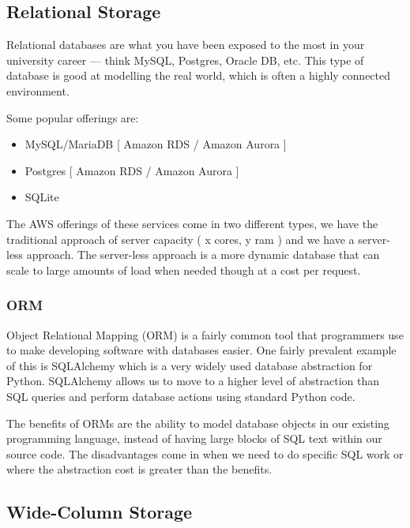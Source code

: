 \documentclass{csse4400}
\begin{document}
\subsection{Relational Storage}

Relational databases are what you have been exposed to the most in your university career ---
think MySQL, Postgres, Oracle DB, etc.
This type of database is good at modelling the real world, which is often a highly connected environment.

Some popular offerings are:
\begin{itemize}
  \item MySQL/MariaDB [ Amazon RDS / Amazon Aurora ]
  \item Postgres [ Amazon RDS / Amazon Aurora ]
  \item SQLite
\end{itemize}

The AWS offerings of these services come in two different types, we have the traditional approach of
server capacity ( x cores, y ram ) and we have a server-less approach.
The server-less approach is a more dynamic
database that can scale to large amounts of load when needed though at a cost per request.

\subsubsection{ORM}
Object Relational Mapping (ORM) is a fairly common tool that programmers use to make developing software with databases easier.
One fairly prevalent example of this is SQLAlchemy which is a very widely used database abstraction for Python.
SQLAlchemy allows us to move to a higher level of abstraction than SQL queries and perform database actions using standard Python code.

The benefits of ORMs are the ability to model database objects in our existing programming language,
instead of having large blocks of SQL text within our source code.
The disadvantages come in when we need to do specific SQL work or where the abstraction cost is greater than the benefits.

\subsection{Wide-Column Storage}

\end{document}
